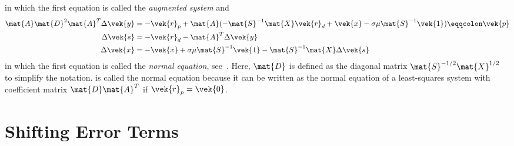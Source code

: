 in which the first equation is called the \emph{augmented system} and 
\begin{subequations}\label{eqn:normal-equation-system}
  \begin{align}
    \mat{A} \mat{D}^2 \mat{A}^T \Delta\vek{y} &= -\vek{r}_p + \mat{A} ( -\mat{S}^{-1} \mat{X} \vek{r}_d + \vek{x} - \sigma \mu \mat{S}^{-1} \vek{1} ) \eqqcolon \vek{p} \label{eqn:normal-equation} \\
    \Delta\vek{s} &= -\vek{r}_d - \mat{A}^T \Delta\vek{y} \label{eqn:s-from-normal} \\
    \Delta\vek{x} &= -\vek{x} + \sigma \mu \mat{S}^{-1} \vek{1} - \mat{S}^{-1} \mat{X} \Delta\vek{s} \label{eqn:x-from-normal}
  \end{align}
\end{subequations}
in which the first equation is called the \emph{normal equation}, see~\cite[p. 16]{Wright-PrimalDualInteriorPointMethods}.
Here, \(\mat{D}\) is defined as the diagonal matrix \(\mat{S}^{-1/2} \mat{X}^{1/2}\) to simplify the notation.
 is called the normal equation because it can be written as the normal equation of a least-squares system with coefficient matrix \(\mat{D}\mat{A}^T\) if \(\vek{r}_p = \vek{0}\).

\section{Shifting Error Terms}\label{sec:ipm-shifting-error-terms}

